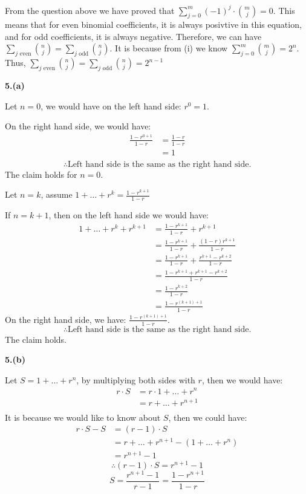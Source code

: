 \documentclass[a4paper,12pt]{report}
\begin{document}
\noindent
From the question above we have proved that $\sum_{j=0}^{m} (-1)^j\cdot{\binom {m}j}=0$. This means that for even binomial coefficients, it is always posivtive in this equation, and for odd coefficients, it is always negative. Therefore, we can have $\sum_{j \text{ even}} \binom {n}j=\sum_{j \text { odd}} \binom {n}j$. It is because from (i) we know $\sum_{j=0}^{m} \binom {m}j=2^n$. Thus, $\sum_{j \text{ even}} \binom {n}j=\sum_{j \text { odd}} \binom {n}j=2^{n-1}$

\noindent
\textbf{5.(a)}

\noindent
Let $n=0$, we would have on the left hand side: $r^0=1$.

\noindent
On the right hand side, we would have:
\begin{align*}
\frac{1-r^{0+1}}{1-r}
&=\frac{1-r}{1-r}\\
&=1\\
\end{align*}
\[\therefore \text{Left hand side is the same as the right hand side.}\]
The claim holds for $n=0$.

\noindent
Let $n=k$, assume $1+\dots+r^k=\frac{1-r^{k+1}}{1-r}$

\noindent
If $n=k+1$, then on the left hand side we would have:
\begin{align*}
1+\dots+r^k+r^{k+1}
&=\frac{1-r^{k+1}}{1-r}+r^{k+1}\\
&=\frac{1-r^{k+1}}{1-r}+\frac{(1-r)r^{k+1}}{1-r}\\
&=\frac{1-r^{k+1}}{1-r}+\frac{r^{k+1}-r^{k+2}}{1-r}\\
&=\frac{1-r^{k+1}+r^{k+1}-r^{k+2}}{1-r}\\
&=\frac{1-r^{k+2}}{1-r}\\
&=\frac{1-r^{(k+1)+1}}{1-r}
\end{align*}
On the right hand side, we have:
$\frac{1-r^{(k+1)+1}}{1-r}$.
\[\therefore \text{Left hand side is the same as the right hand side.}\]
The claim holds.

\noindent
\textbf{5.(b)}

\noindent
Let $S=1+\dots+r^n$, by multiplying both sides with $r$, then we would have:
\begin{align*}
r\cdot{S}
&=r\cdot{1+\dots+r^n}\\
&=r+\dots+r^{n+1}\\
\end{align*}
It is because we would like to know about $S$, then we could have:
\begin{align*}
r\cdot{S}-S
&=(r-1)\cdot{S}\\
&=r+\dots+r^{n+1}-(1+\dots+r^n)\\
&=r^{n+1}-1
\end{align*}
\[\therefore(r-1)\cdot{S}=r^{n+1}-1\]
\[S=\frac{r^{n+1}-1}{r-1}=\frac{1-r^{n+1}}{1-r}\]
\end{document}
